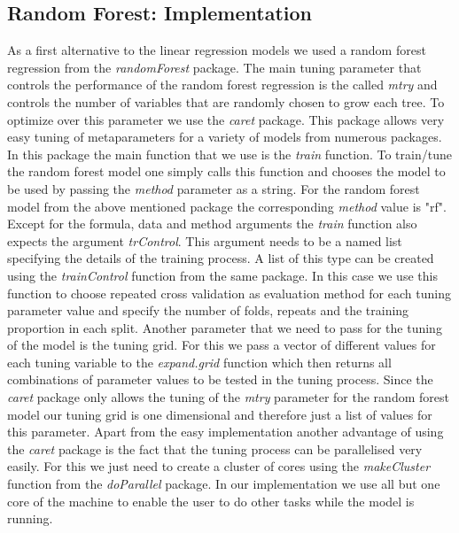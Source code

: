\subsection{Random Forest: Implementation}
As a first alternative to the linear regression models we used a random forest regression from the \textit{randomForest} package. The main tuning parameter that controls the performance of the random forest regression is the called \textit{mtry} and controls the number of variables that are randomly chosen to grow each tree. To optimize over this parameter we use the \textit{caret} package. This package allows very easy tuning of metaparameters for a variety of models from numerous packages. In this package the main function that we use is the \textit{train} function. To train/tune the random forest model one simply calls this function and chooses the model to be used by passing the \textit{method} parameter as a string. For the random forest model from the above mentioned package the corresponding \textit{method} value is "rf". Except for the formula, data and method arguments the \textit{train} function also expects the argument \textit{trControl}. This argument needs to be a named list specifying the details of the training process. A list of this type can be created using the \textit{trainControl} function from the same package. In this case we use this function to choose repeated cross validation as evaluation method for each tuning parameter value and specify the number of folds, repeats and the training proportion in each split.  Another parameter that we need to pass for the tuning of the model is the tuning grid. For this we pass a vector of different values for each tuning variable to the \textit{expand.grid} function which then returns all combinations of parameter values to be tested in the tuning process. Since the \textit{caret} package only allows the tuning of the \textit{mtry} parameter for the random forest model our tuning grid is one dimensional and therefore just a list of values for this parameter. Apart from the easy implementation another advantage of using the \textit{caret} package is the fact that the tuning process can be parallelised very easily. For this we just need to create a cluster of cores using the \textit{makeCluster} function from the \textit{doParallel} package. In our implementation we use all but one core of the machine to enable the user to do other tasks while the model is running.

